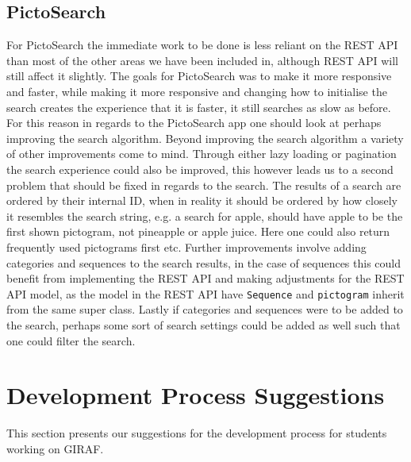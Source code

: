 \subsection*{PictoSearch}
For PictoSearch the immediate work to be done is less reliant on the REST API than most of the other areas we have been included in, although REST API will still affect it slightly.
The goals for PictoSearch was to make it more responsive and faster, while making it more responsive and changing how to initialise the search creates the experience that it is faster, it still searches as slow as before.
For this reason in regards to the PictoSearch app one should look at perhaps improving the search algorithm.
Beyond improving the search algorithm a variety of other improvements come to mind. 
Through either lazy loading or pagination the search experience could also be improved, this however leads us to a second problem that should be fixed in regards to the search.
The results of a search are ordered by their internal ID, when in reality it should be ordered by how closely it resembles the search string, e.g. a search for apple, should have apple to be the first shown pictogram, not pineapple or apple juice.
Here one could also return frequently used pictograms first etc.
Further improvements involve adding categories and sequences to the search results, in the case of sequences this could benefit from implementing the REST API and making adjustments for the REST API model, as the model in the REST API have \texttt{Sequence} and \texttt{pictogram} inherit from the same super class.
Lastly if categories and sequences were to be added to the search, perhaps some sort of search settings could be added as well such that one could filter the search.

\section{Development Process Suggestions}
This section presents our suggestions for the development process for students working on GIRAF.

